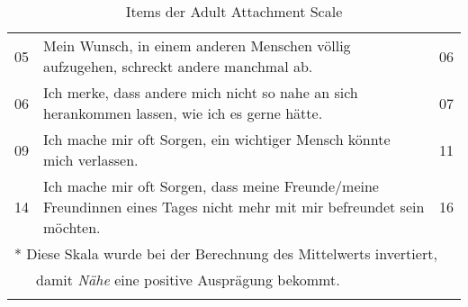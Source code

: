 \begin{table}[htbp]
\begin{tabular}{|l | m{30em} | p{2em}|}
  05 & Mein Wunsch, in einem anderen Menschen völlig aufzugehen, schreckt andere manchmal ab. & 06 \\
  06 & Ich merke, dass andere mich nicht so nahe an sich herankommen lassen, wie ich es gerne hätte. & 07 \\
  09 & Ich mache mir oft Sorgen, ein wichtiger Mensch könnte mich verlassen. & 11 \\
  14 & Ich mache mir oft Sorgen, dass meine Freunde/meine Freundinnen eines Tages nicht mehr mit mir befreundet sein möchten. & 16 \\
  \hline
  \multicolumn{3}{l}{* Diese Skala wurde bei der Berechnung des Mittelwerts invertiert,}\\
  \multicolumn{3}{l}{~~~damit \textit{Nähe} eine positive Ausprägung bekommt.}\\
  \multicolumn{3}{l}{}\\
\end{tabular}
\caption{Items der Adult Attachment Scale}
\label{table:AAS}
\end{table}
